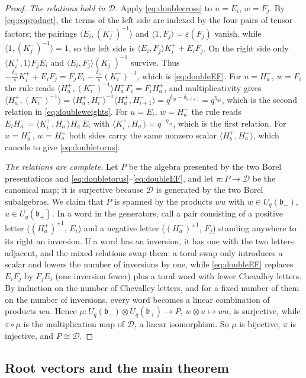 \documentclass[11pt]{article}
\theoremstyle{remark}
\newcommand{\U}{U_q}
\newcommand{\bp}{\mathfrak b_+}
\newcommand{\bm}{\mathfrak b_-}
\newcommand{\ot}{\otimes}
\newcommand{\la}{\langle}
\newcommand{\ra}{\rangle}
\newcommand{\cD}{\mathcal D}
\begin{document}
\begin{proof}
\emph{The relations hold in $\cD$.} Apply \eqref{eq:doublecross} to
$u=E_i$, $w=F_j$. By \eqref{eq:coproduct}, the terms of the left side
are indexed by the four pairs of tensor factors; the pairings
$\la E_i,(K^-_j)^{-1}\ra$ and $\la1,F_j\ra=\varepsilon(F_j)$ vanish, while
$\la1,(K^-_j)^{-1}\ra=1$, so the left side is
$\la E_i,F_j\ra K^+_i+E_iF_j$. On the right side only
$\la K^+_i,1\ra F_jE_i$ and $\la E_i,F_j\ra(K^-_j)^{-1}$ survive.
Thus
$-\frac{\delta_{ij}}s K^+_i+E_iF_j=F_jE_i-\frac{\delta_{ij}}s(K^-_i)^{-1}$,
which is \eqref{eq:doubleEF}. For $u=H^+_a$, $w=F_i$ the rule reads
$\la H^+_a,(K^-_i)^{-1}\ra H^+_aF_i=F_iH^+_a$, and multiplicativity
gives
$\la H^+_a,(K^-_i)^{-1}\ra
 =\la H^+_a,H^-_i\ra^{-1}\la H^+_a,H^-_{i+1}\ra
 =q^{\delta_{ai}-\delta_{a,i+1}}=q^{\eta_{ai}}$,
which is the second relation in \eqref{eq:doubleweights}. For $u=E_i$,
$w=H^-_a$ the rule reads $E_iH^-_a=\la K^+_i,H^-_a\ra H^-_aE_i$ with
$\la K^+_i,H^-_a\ra=q^{-\eta_{ai}}$, which is the first relation. For
$u=H^+_b$, $w=H^-_a$ both sides carry the same nonzero scalar
$\la H^+_b,H^-_a\ra$, which cancels to give \eqref{eq:doubletorus}.

\emph{The relations are complete.} Let $P$ be the algebra presented by
the two Borel presentations and
\eqref{eq:doubletorus}--\eqref{eq:doubleEF}, and let $\pi:P\to\cD$ be
the canonical map; it is surjective because $\cD$ is generated by the
two Borel subalgebras. We claim that $P$ is spanned by the products
$wu$ with $w\in\U(\bm)$, $u\in\U(\bp)$. In a word in the generators,
call a pair consisting of a positive letter ($(H^+_a)^{\pm1}$, $E_i$)
and a negative letter ($(H^-_a)^{\pm1}$, $F_j$) standing anywhere to
its right an inversion. If a word has an inversion, it has one with the
two letters adjacent, and the mixed relations swap them: a toral swap
only introduces a scalar and lowers the number of inversions by one,
while \eqref{eq:doubleEF} replaces $E_iF_j$ by $F_jE_i$ (one inversion
fewer) plus a toral word with fewer Chevalley letters. By induction on
the number of Chevalley letters, and for a fixed number of them on the
number of inversions, every word becomes a linear combination of
products $wu$. Hence
$\mu:\U(\bm)\ot\U(\bp)\to P$, $w\ot u\mapsto wu$, is surjective, while
$\pi\circ\mu$ is the multiplication map of $\cD$, a linear isomorphism.
So $\mu$ is bijective, $\pi$ is injective, and $P\cong\cD$.
\end{proof}

\subsection{Root vectors and the main theorem}
\end{document}
